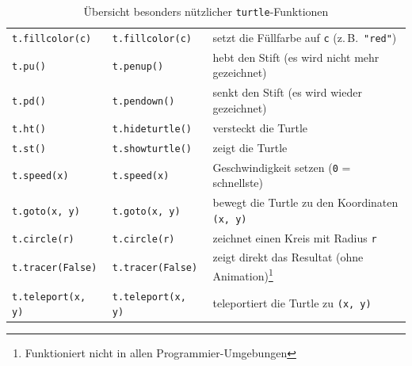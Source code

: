 \begin{myoverview}
\begin{table}[H]
\begin{tabular}{lll}
			\lstinline|t.fillcolor(c)|   & \lstinline|t.fillcolor(c)|   & setzt die Füllfarbe auf \lstinline|c| (z.\,B.\ \lstinline|"red"|)                                                                      \\
			\lstinline|t.pu()|           & \lstinline|t.penup()|        & hebt den Stift (es wird nicht mehr gezeichnet)                                                          \\
			\lstinline|t.pd()|           & \lstinline|t.pendown()|      & senkt den Stift (es wird wieder gezeichnet)                                                             \\
			\lstinline|t.ht()|           & \lstinline|t.hideturtle()|   & versteckt die Turtle                                                                                    \\
			\lstinline|t.st()|           & \lstinline|t.showturtle()|   & zeigt die Turtle                                                                                        \\
			\lstinline|t.speed(x)|       & \lstinline|t.speed(x)|       & Geschwindigkeit setzen (\lstinline|0| = schnellste)                                                     \\
			\lstinline|t.goto(x, y)|     & \lstinline|t.goto(x, y)|     & bewegt die Turtle zu den Koordinaten \lstinline|(x, y)|                                                 \\
			\lstinline|t.circle(r)|      & \lstinline|t.circle(r)|      & zeichnet einen Kreis mit Radius \lstinline|r|                                                           \\
			\lstinline|t.tracer(False)|  & \lstinline|t.tracer(False)|  & zeigt direkt das Resultat (ohne Animation)\footnote{Funktioniert nicht in allen Programmier-Umgebungen} \\
			\lstinline|t.teleport(x, y)| & \lstinline|t.teleport(x, y)| & teleportiert die Turtle zu \lstinline|(x, y)|                                                           \\
			\midrule
		\end{tabular}
		\caption{Übersicht besonders nützlicher \texttt{turtle}-Funktionen}
	\end{table}
\end{myoverview}


